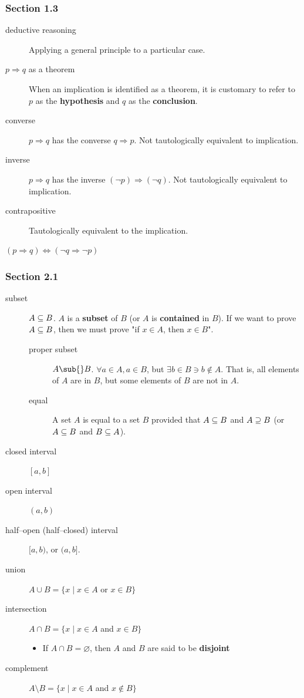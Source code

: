 \documentclass[12pt]{article}
\begin{document}
\subsubsection{Section 1.3}
\label{sec:org5b2dd0e}
\begin{description}
\item[{deductive reasoning}] Applying a general principle to a particular case.
\item[{\(p \Rightarrow q\) as a theorem}] When an implication is identified as a theorem, it is
customary to refer to \(p\) as the \textbf{hypothesis} and \(q\) as the \textbf{conclusion}.
\item[{converse}] \(p\Rightarrow{}q\) has the converse \(q \Rightarrow p\). Not tautologically equivalent to
implication.
\item[{inverse}] \(p \Rightarrow{} q\) has the inverse \((\neg p) \Rightarrow (\neg q)\). Not tautologically
equivalent to implication.
\item[{contrapositive}] Tautologically equivalent to the implication.
\end{description}
\begin{center}
\((p \Rightarrow{} q) \Leftrightarrow (\neg q \Rightarrow \neg p)\)
\end{center}

\subsubsection{Section 2.1}
\label{sec:org0ddc1a2}
\begin{description}
\item[{subset}] \(A\subseteq{}B\). \(A\) is a \textbf{subset} of \(B\) (or \(A\) is \textbf{contained} in \(B\)). If we
want to prove \(A\subseteq{}B\), then we must prove "if \(x\in{}A\), then \(x\in{}B\)".
\begin{description}
\item[{proper subset}] \(A\sub{}B\). \(\forall{}a\in{}A, a\in{}B\), but \(\exists{}b\in{}B\ni{}b\notin{}A\). That is, all elements
of \(A\) are in \(B\), but some elements of \(B\) are not in \(A\).
\item[{equal}] A set \(A\) is equal to a set \(B\) provided that \(A\subseteq{}B\) and \(A\supseteq{}B\) (or
\(A\subseteq{}B\) and \(B\subseteq{}A\)).
\end{description}
\item[{closed interval}] \([a,b]\)
\item[{open interval}] \((a,b)\)
\item[{half--open (half--closed) interval}] \([a,b)\), or \((a,b]\).
\item[{union}] \(A \cup B = \{x \mid x\in A\) or \(x\in B\}\)
\item[{intersection}] \(A \cap B=\{x \mid x\in A\) and \(x \in B\}\)
\begin{itemize}
\item If \(A\cap{}B=\varnothing\), then \(A\) and \(B\) are said to be \textbf{disjoint}
\end{itemize}
\item[{complement}] \(A \setminus{} B=\{x\mid{}x\in{}A\) and \(x\notin{}B\}\)
\end{description}
\end{document}
